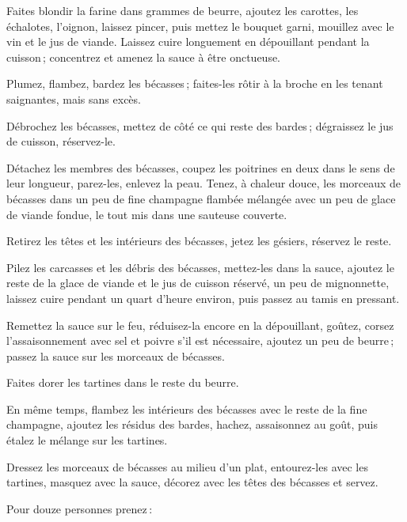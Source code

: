 Faites blondir la farine dans {\mmm} grammes de beurre, ajoutez les
carottes, les échalotes, l'oignon, laissez pincer, puis mettez le bouquet
garni, mouillez avec le vin et le jus de viande. Laissez cuire longuement en
dépouillant pendant la cuisson ; concentrez et amenez la sauce à être
onctueuse.

Plumez, flambez, bardez les bécasses ; faites-les rôtir à la broche en les
tenant saignantes, mais sans excès.

Débrochez les bécasses, mettez de côté ce qui reste des bardes ; dégraissez le
jus de cuisson, réservez-le.

Détachez les membres des bécasses, coupez les poitrines en deux dans le sens de
leur longueur, parez-les, enlevez la peau. Tenez, à chaleur douce, les morceaux
de bécasses dans un peu de fine champagne flambée mélangée avec un peu de glace
de viande fondue, le tout mis dans une sauteuse couverte.

Retirez les têtes et les intérieurs des bécasses, jetez les gésiers, réservez
le reste.

Pilez les carcasses et les débris des bécasses, mettez-les dans la sauce,
ajoutez le reste de la glace de viande et le jus de cuisson réservé, un peu de
mignonnette, laissez cuire pendant un quart d'heure environ, puis passez au
tamis en pressant.

Remettez la sauce sur le feu, réduisez-la encore en la dépouillant, goûtez,
corsez l’assaisonnement avec sel et poivre s'il est nécessaire, ajoutez un peu
de beurre ; passez la sauce sur les morceaux de bécasses.

Faites dorer les tartines dans le reste du beurre.

En même temps, flambez les intérieurs des bécasses avec le reste de la fine
champagne, ajoutez les résidus des bardes, hachez, assaisonnez au goût, puis
étalez le mélange sur les tartines.

Dressez les morceaux de bécasses au milieu d'un plat, entourez-les avec les
tartines, masquez avec la sauce, décorez avec les têtes des bécasses et servez.

\begin{center}
\small{}
\end{center}

Pour douze personnes prenez :


